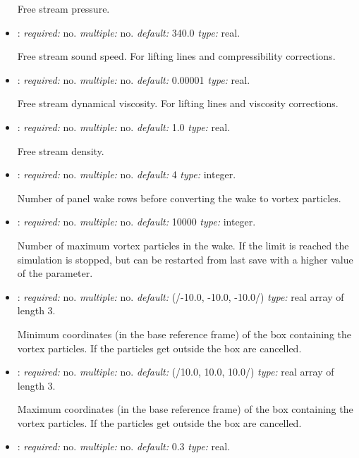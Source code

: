 \begin{itemize}
Free stream pressure.

\item {}: \textit{required:} no. \textit{multiple:} no. \textit{default:} 340.0 \textit{type:} real.

Free stream sound speed. For lifting lines and compressibility corrections.


\item {}: \textit{required:} no. \textit{multiple:} no. \textit{default:} 0.00001 \textit{type:} real.

Free stream dynamical viscosity. For lifting lines and viscosity corrections.

\item {}: \textit{required:} no. \textit{multiple:} no. \textit{default:} 1.0 \textit{type:} real.

Free stream density.

\item {}: \textit{required:} no. \textit{multiple:} no. \textit{default:} 4 \textit{type:} integer.

Number of panel wake rows before converting the wake to vortex particles.


\item {}: \textit{required:} no. \textit{multiple:} no. \textit{default:} 10000 \textit{type:} integer.

Number of maximum vortex particles in the wake. If the limit is reached the simulation is stopped, but can be restarted from last save with a higher value of the parameter. 


\item {}: \textit{required:} no. \textit{multiple:} no. \textit{default:} (/-10.0, -10.0, -10.0/) \textit{type:} real array of length 3.

Minimum coordinates (in the base reference frame) of the box containing the vortex particles. If the particles get outside the box are cancelled.

\item {}: \textit{required:} no. \textit{multiple:} no. \textit{default:} (/10.0, 10.0, 10.0/) \textit{type:} real array of length 3.

Maximum coordinates (in the base reference frame) of the box containing the vortex particles. If the particles get outside the box are cancelled.

\item {}: \textit{required:} no. \textit{multiple:} no. \textit{default:} 0.3 \textit{type:} real.


\end{itemize}
